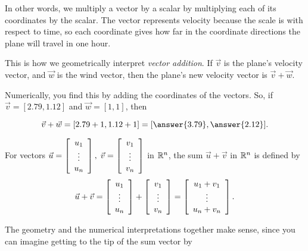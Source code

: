 \documentclass{ximera}
\begin{document}
In other words, we multiply a vector by a scalar by multiplying each of its coordinates by the scalar. The vector represents velocity because the scale is with respect to time, so each coordinate gives how far in the coordinate directions the plane will travel in one hour.


This is how we geometrically interpret \emph{vector addition}. If $\vec{v}$ is the plane's velocity vector, and $\vec{w}$ is the wind vector, then the plane's new velocity vector is $\vec{v}+\vec{w}$. 

Numerically, you find this by adding the coordinates of the vectors. So, if $\vec{v}=[2.79,1.12]$ and $\vec{w}=[1,1]$, then 

\[
\vec{v}+\vec{w}=[2.79+1,1.12+1]=[\answer{3.79},\answer{2.12}].
\]

\begin{definition}
  For vectors $\vec{u}=\startmat{c}
    u_1 \\
    \vdots \\
    u_n
  \stopmat,\; \vec{v}= \startmat{c}
    v_1 \\
    \vdots \\
    v_n
  \stopmat$ in $\R^n$, the sum $\vec{u}+\vec{v}$ in $\R^n$ is defined
  by
  \begin{equation*}
    \vec{u}+\vec{v} = \startmat{c}
      u_1 \\
      \vdots \\
      u_n
    \stopmat +  \startmat{c}
      v_1 \\
      \vdots \\
      v_n
    \stopmat
    = \startmat{c}
      u_1+v_1 \\
      \vdots \\
      u_n+v_n
    \stopmat.
  \end{equation*}
\end{definition}

The geometry and the numerical interpretations together make sense, since you can imagine getting to the tip of the sum vector by 
\end{document}
